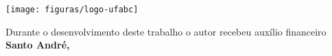 \thispagestyle{empty}
\texttt{[image: figuras/logo-ufabc]} \hfill

\vspace*{2.8cm}
\begin{center}
  {\Large \scshape \autor}
\end{center}
\vspace{5cm}
\begin{center}
  {\huge \scshape \bfseries \titulo}
\end{center}
\vfill
\begin{center}
  { Durante o desenvolvimento deste trabalho o autor
recebeu auxílio financeiro \fomento \\} \vspace{0.8cm}
  {\bfseries Santo  André, \ano}
\end{center}
